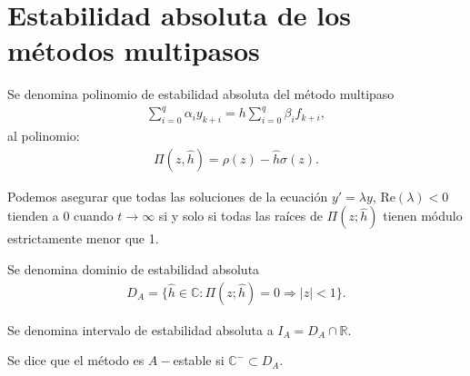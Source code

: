 \section{Estabilidad absoluta de los métodos multipasos}

\begin{defi}
Se denomina polinomio de estabilidad absoluta del método multipaso
\begin{align*}
    \sum_{i=0}^{q} \alpha_i y_{k+i} = h\sum_{i=0}^{q} \beta_i f_{k+i},
\end{align*}
al polinomio:
\begin{align*}
    \Pi(z,\hat{h}) = \rho(z) - \hat{h}\sigma(z).
\end{align*}
\end{defi}

\begin{obs}
Podemos asegurar que todas las soluciones de la ecuación $y' = \lambda y$, $\text{Re}(\lambda) < 0$ tienden a 0 cuando $t \to \infty$ si y solo si todas las raíces de $\Pi(z;\hat{h})$ tienen módulo estrictamente menor que 1.
\end{obs}

\begin{defi}
Se denomina dominio de estabilidad absoluta 
\begin{align*}
    D_A = \{ \hat{h} \in \mathbb{C} : \Pi(z;\hat{h}) = 0 \Longrightarrow|z| < 1\}.
\end{align*}
\end{defi}

\begin{defi}
Se denomina intervalo de estabilidad absoluta a $I_A = D_A \cap \mathbb{R}$.
\end{defi}

\begin{defi}
Se dice que el método es $A-$estable si $\mathbb{C}^- \subset D_A$.
\end{defi}

